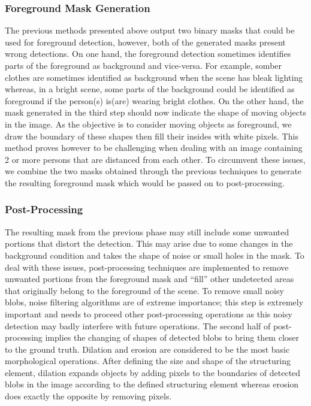 \subsubsection{Foreground Mask Generation}
The previous methods presented above output two binary masks that could be used for foreground detection, however, both of the generated masks present wrong detections. On one hand, the foreground detection sometimes identifies parts of the foreground as background and vice-versa. For example, somber clothes are sometimes identified as background when the scene has bleak lighting whereas, in a bright scene, some parts of the background could be identified as foreground if the person(s) is(are) wearing bright clothes. On the other hand, the mask generated in the third step should now indicate the shape of moving objects in the image. As the objective is to consider moving objects as foreground, we draw the boundary of these shapes then fill their insides with white pixels. This method proves however to be challenging when dealing with an image containing 2 or more persons that are distanced from each other. To circumvent these issues, we combine the two masks obtained through the previous techniques to generate the resulting foreground mask which would be passed on to post-processing.     
\subsubsection{Post-Processing}
The resulting mask from the previous phase may still include some unwanted portions that distort the detection. This may arise due to some changes in the background condition and takes the shape of noise or small holes in the mask. To deal with these issues, post-processing techniques are implemented to remove unwanted portions from the foreground mask and “fill” other undetected areas that originally belong to the foreground of the scene. To remove small noisy blobs, noise filtering algorithms are of extreme importance; this step is extremely important and needs to proceed other post-processing operations as this noisy detection may badly interfere with future operations.  The second half of post-processing implies the changing of shapes of detected blobs to bring them closer to the ground truth. Dilation and erosion are considered to be the most basic morphological operations. After defining the size and shape of the structuring element, dilation expands objects by adding pixels to the boundaries of detected blobs in the image according to the defined structuring element whereas erosion does exactly the opposite by removing pixels.  
